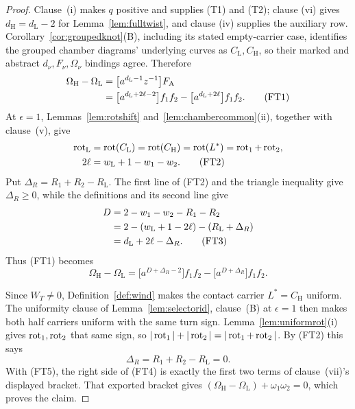 \begin{proof}
Clause~(i) makes $q$ positive and supplies (T1) and (T2);
clause (vi) gives $d_{\mathrm H}=d_{\mathrm L}-2$ for
Lemma~\ref{lem:fulltwist}, and clause (iv) supplies the auxiliary row.
Corollary~\ref{cor:groupedknot}(B), including its stated empty-carrier case,
identifies the grouped chamber diagrams' underlying curves as
$C_{\mathrm L},C_{\mathrm H}$, so their marked and abstract $d_\nu,F_\nu,\Omega_\nu$ bindings agree. Therefore
\begin{align}
 \Omega_{\mathrm H}-\Omega_{\mathrm L}
 &=\bigl[a^{d_{\mathrm L}-1}z^{-1}\bigr]F_{\mathrm A}\notag\\
 &=\bigl[a^{d_{\mathrm L}+2\ell-2}\bigr]f_1f_2
   -\bigl[a^{d_{\mathrm L}+2\ell}\bigr]f_1f_2. \tag{FT1}
\end{align}
At $\epsilon=1$, Lemmas~\ref{lem:rotshift} and~\ref{lem:chambercommon}(ii),
together with clause~(v), give
\begin{align}
 \operatorname{rot}_{\mathrm L}&=\operatorname{rot}(C_{\mathrm L})=\operatorname{rot}(C_{\mathrm H})
 =\operatorname{rot}(L^*)=\operatorname{rot}_1+\operatorname{rot}_2,\notag\\
 2\ell&=w_{\mathrm L}+1-w_1-w_2. \tag{FT2}
\end{align}
Put $\Delta_R=R_1+R_2-R_{\mathrm L}$. The first line of (FT2) and the triangle
inequality give $\Delta_R\geq0$, while the definitions and its second line give
\begin{align}
 D&=2-w_1-w_2-R_1-R_2\notag\\
  &=2-(w_{\mathrm L}+1-2\ell)-(R_{\mathrm L}+\Delta_R)\notag\\
  &=d_{\mathrm L}+2\ell-\Delta_R. \tag{FT3}
\end{align}
Thus (FT1) becomes
\begin{equation}
 \Omega_{\mathrm H}-\Omega_{\mathrm L}
 =\bigl[a^{D+\Delta_R-2}\bigr]f_1f_2
  -\bigl[a^{D+\Delta_R}\bigr]f_1f_2. \tag{FT4}
\end{equation}

Since $W_T\neq0$, Definition~\ref{def:wind} makes the contact carrier
$L^*=C_{\mathrm H}$ uniform. The uniformity clause of
Lemma~\ref{lem:selectorid}, clause~(B) at $\epsilon=1$ then makes both half carriers
uniform with the same turn sign. Lemma~\ref{lem:uniformrot}(i) gives
$\operatorname{rot}_1,\operatorname{rot}_2$ that same sign, so
$|\operatorname{rot}_1|+|\operatorname{rot}_2|=|\operatorname{rot}_1+\operatorname{rot}_2|$. By (FT2) this says
\begin{equation}
   \Delta_R=R_1+R_2-R_{\mathrm L}=0. \tag{FT5}
\end{equation}
With (FT5), the right side of (FT4) is exactly the first two terms of
clause~(vii)'s displayed bracket. That exported bracket gives
$(\Omega_{\mathrm H}-\Omega_{\mathrm L})+\omega_1\omega_2=0$, which proves
the claim.
\end{proof}

